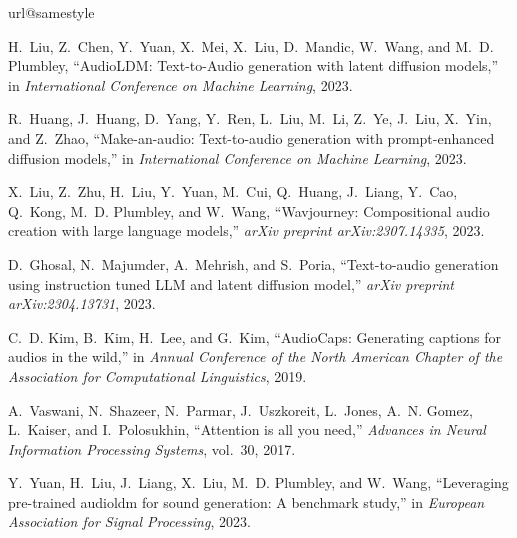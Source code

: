 \documentclass{article}
\def\L{{\cal L}}
\begin{document}
\begin{thebibliography}{10}
\providecommand{\url}[1]{#1}
\csname url@samestyle\endcsname
\providecommand{\newblock}{\relax}
\providecommand{\bibinfo}[2]{#2}
\providecommand{\BIBentrySTDinterwordspacing}{\spaceskip=0pt\relax}
\providecommand{\BIBentryALTinterwordstretchfactor}{4}
\providecommand{\BIBentryALTinterwordspacing}{\spaceskip=\fontdimen2\font plus
\BIBentryALTinterwordstretchfactor\fontdimen3\font minus \fontdimen4\font\relax}
\providecommand{\BIBforeignlanguage}[2]{{\expandafter\ifx\csname l@#1\endcsname\relax
\typeout{** WARNING: IEEEtran.bst: No hyphenation pattern has been}\typeout{** loaded for the language `#1'. Using the pattern for}\typeout{** the default language instead.}\else
\language=\csname l@#1\endcsname
\fi
#2}}
\providecommand{\BIBdecl}{\relax}
\BIBdecl

H.~{Liu}, Z.~{Chen}, Y.~{Yuan}, X.~{Mei}, X.~{Liu}, D.~{Mandic}, W.~{Wang}, and M.~D. {Plumbley}, ``{AudioLDM: Text-to-Audio generation with latent diffusion models},'' in \emph{International Conference on Machine Learning}, 2023.

R.~Huang, J.~Huang, D.~Yang, Y.~Ren, L.~Liu, M.~Li, Z.~Ye, J.~Liu, X.~Yin, and Z.~Zhao, ``Make-an-audio: Text-to-audio generation with prompt-enhanced diffusion models,'' in \emph{International Conference on Machine Learning}, 2023.

X.~Liu, Z.~Zhu, H.~Liu, Y.~Yuan, M.~Cui, Q.~Huang, J.~Liang, Y.~Cao, Q.~Kong, M.~D. Plumbley, and W.~Wang, ``Wavjourney: Compositional audio creation with large language models,'' \emph{arXiv preprint arXiv:2307.14335}, 2023.

D.~Ghosal, N.~Majumder, A.~Mehrish, and S.~Poria, ``Text-to-audio generation using instruction tuned {LLM} and latent diffusion model,'' \emph{arXiv preprint arXiv:2304.13731}, 2023.

C.~D. Kim, B.~Kim, H.~Lee, and G.~Kim, ``{AudioCaps}: Generating captions for audios in the wild,'' in \emph{Annual Conference of the North American Chapter of the Association for Computational Linguistics}, 2019.

A.~Vaswani, N.~Shazeer, N.~Parmar, J.~Uszkoreit, L.~Jones, A.~N. Gomez, {\L}.~Kaiser, and I.~Polosukhin, ``Attention is all you need,'' \emph{Advances in Neural Information Processing Systems}, vol.~30, 2017.

Y.~Yuan, H.~Liu, J.~Liang, X.~Liu, M.~D. Plumbley, and W.~Wang, ``Leveraging pre-trained audioldm for sound generation: A benchmark study,'' in \emph{European Association for Signal Processing}, 2023.


\end{thebibliography}
\end{document}
